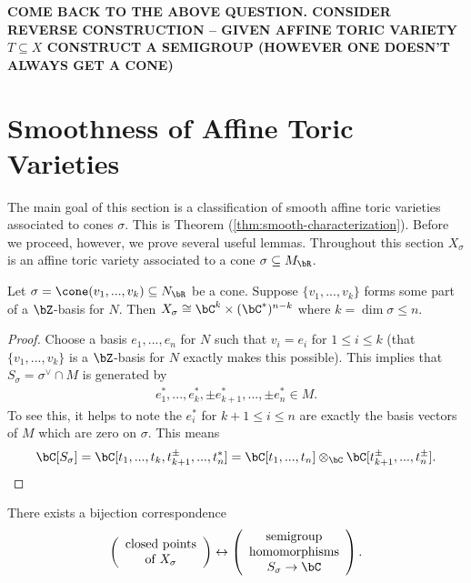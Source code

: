 \begin{center}
	\textbf{COME BACK TO THE ABOVE QUESTION. CONSIDER REVERSE CONSTRUCTION -- GIVEN AFFINE TORIC VARIETY $T \subseteq X$ CONSTRUCT A SEMIGROUP (HOWEVER ONE DOESN'T ALWAYS GET A CONE)}
\end{center}

\newpage

\section{Smoothness of Affine Toric Varieties}

The main goal of this section is a classification of smooth affine toric varieties associated to cones $\sigma$. This is Theorem (\ref{thm:smooth-characterization}). Before we proceed, however, we prove several useful lemmas. Throughout this section $X_\sigma$ is an affine toric variety associated to a cone $\sigma \subseteq M_\bR$.
\begin{lem}\label{lem:Z-basis-smooth-lemma}
	Let $\sigma = \cone(v_1,...,v_k)\subseteq N_\bR$ be a cone. Suppose $\{v_1,...,v_k\}$ forms some part of a $\bZ$-basis for $N$. Then $X_\sigma \cong \bC^k\times (\bC^*)^{n-k}$ where $k = \dim \sigma \leq n$.
\end{lem}
\begin{proof}
	Choose a basis $e_1,...,e_n$ for $N$ such that $v_i = e_i$ for $1 \leq i\leq k$ (that $\{v_1,...,v_k\}$ is a $\bZ$-basis for $N$ exactly makes this possible). This implies that $S_\sigma = \sigma^{\vee}\cap M$ is generated by 
	\begin{align*}
		e_1^*,...,e_k^*, \pm e_{k+1}^*,...,\pm e_n^* \in M.
	\end{align*}
	To see this, it helps to note the $e_{i}^*$ for $k+1 \leq i\leq n$ are exactly the basis vectors of $M$ which are zero on $\sigma$. This means
	\begin{align*}
		\bC[S_\sigma] = \bC[t_1,...,t_k,t_{k+1}^{\pm}, ..., t_n^{*}] = \bC[t_1,...,t_n] \otimes_\bC \bC[t_{k+1}^\pm, ...,t_n^\pm]. 
	\end{align*}
\end{proof}

\begin{lem}\label{lem:closed-points-and-semigroup-hom}
	There exists a bijection correspondence
	\begin{align*}
		\left(\begin{array}{c}
			\text{closed points} \\
			\text{of } X_\sigma
		\end{array}\right) \leftrightarrow
		\left(\begin{array}{c}
			\text{semigroup} \\
			\text{homomorphisms} \\
			S_\sigma \to \bC
		\end{array}\right).
	\end{align*}
\end{lem}

